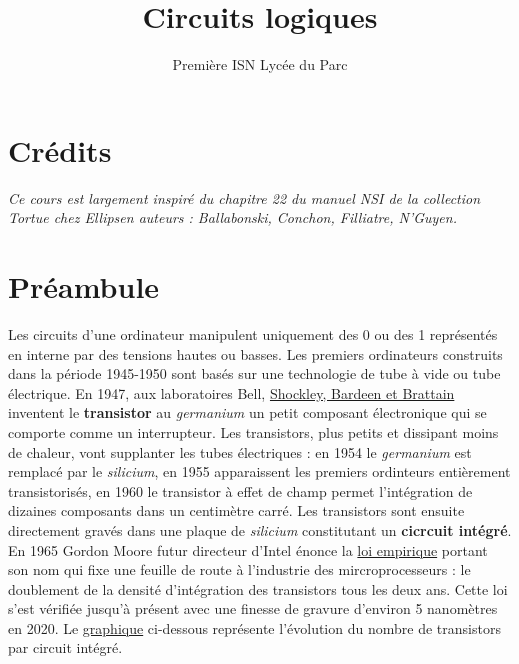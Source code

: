 \documentclass[
  11pt,
]{article}
\title{Circuits logiques}
\author{Première ISN Lycée du Parc}
\date{}
\newcounter{logi}
\begin{document}
\maketitle

\renewcommand*\contentsname{Table des matières}
{
\hypersetup{linkcolor=}
\setcounter{tocdepth}{3}
\tableofcontents
}
\hypertarget{cruxe9dits}{%
\section*{Crédits}\label{cruxe9dits}}

\emph{Ce cours est largement inspiré du chapitre 22 du manuel NSI de la
collection Tortue chez Ellipsen auteurs : Ballabonski, Conchon,
Filliatre, N'Guyen.}

\hypertarget{pruxe9ambule}{%
\section*{Préambule}\label{pruxe9ambule}}

Les circuits d'une ordinateur manipulent uniquement des 0 ou des 1
représentés en interne par des tensions hautes ou basses. Les premiers
ordinateurs construits dans la période 1945-1950 sont basés sur une
technologie de tube à vide ou tube électrique. En 1947, aux laboratoires
Bell, \href{https://fr.wikipedia.org/wiki/Transistor}{Shockley, Bardeen
et Brattain} inventent le \textbf{transistor} au \emph{germanium} un
petit composant électronique qui se comporte comme un interrupteur. Les
transistors, plus petits et dissipant moins de chaleur, vont supplanter
les tubes électriques : en 1954 le \emph{germanium} est remplacé par le
\emph{silicium}, en 1955 apparaissent les premiers ordinteurs
entièrement transistorisés, en 1960 le transistor à effet de champ
permet l'intégration de dizaines composants dans un centimètre carré.
Les transistors sont ensuite directement gravés dans une plaque de
\emph{silicium} constitutant un \textbf{cicrcuit intégré}. En 1965
Gordon Moore futur directeur d'Intel énonce la
\href{https://fr.wikipedia.org/wiki/Loi_de_Moore}{loi empirique} portant
son nom qui fixe une feuille de route à l'industrie des
mircroprocesseurs : le doublement de la densité d'intégration des
transistors tous les deux ans. Cette loi s'est vérifiée jusqu'à présent
avec une finesse de gravure d'environ 5 nanomètres en 2020. Le
\href{https://en.wikipedia.org/wiki/Moore\%27s_law\#/media/File:Moore's_Law_Transistor_Count_1971-2018.png}{graphique}
ci-dessous représente l'évolution du nombre de transistors par circuit
intégré.
\end{document}
